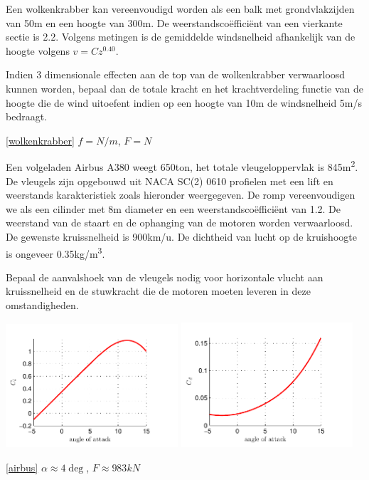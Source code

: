 \begin{toepassing}
	\label{wolkenkrabber}
Een wolkenkrabber kan vereenvoudigd worden als een balk met grondvlakzijden van 50m en een hoogte van 300m. De weerstandscoëfficiënt van een vierkante sectie is 2.2. Volgens metingen is de gemiddelde windsnelheid afhankelijk van de hoogte volgens $v = C z^{0.40}$.

Indien 3 dimensionale effecten aan de top van de wolkenkrabber verwaarloosd kunnen worden, bepaal dan de totale kracht en het krachtverdeling functie van de hoogte die de wind uitoefent indien op een hoogte van 10m de windsnelheid 5m/s bedraagt.
\end{toepassing}
\begin{antwoord}{\ref{wolkenkrabber}}
	$f = \unit{N/m}$, $F = \unit{N}$
\end{antwoord}
\begin{toepassing}[*]
	\label{airbus}
Een volgeladen Airbus A380 weegt 650ton, het totale vleugeloppervlak is 845\unit{m^2}. De vleugels zijn opgebouwd uit NACA SC(2) 0610 profielen met een lift en weerstands karakteristiek zoals hieronder weergegeven. De romp vereenvoudigen we als een cilinder met 8m diameter en een weerstandscoëfficiënt van 1.2. De weerstand van de staart en de ophanging van de motoren worden verwaarloosd. De gewenste kruissnelheid is 900km/u. De dichtheid van lucht op de kruishoogte is ongeveer 0.35\unit{kg/m^3}.
		
Bepaal de aanvalshoek van de vleugels nodig voor horizontale vlucht aan kruissnelheid en de stuwkracht die de motoren moeten leveren in deze omstandigheden.

	\centering
	\includegraphics[width=0.48\textwidth]{fig/uitwendige_stroming/NACA_SC(2)_0610_Cl.pdf}
	\includegraphics[width=0.48\textwidth]{fig/uitwendige_stroming/NACA_SC(2)_0610_Cd.pdf}
\end{toepassing}
\begin{antwoord}{\ref{airbus}}
	$\alpha \approx 4\deg$, $F \approx 983\unit{kN}$
\end{antwoord}


